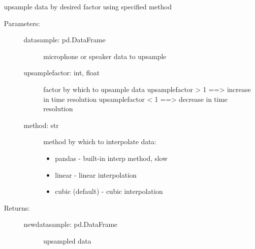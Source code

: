 \documentclass[letterpaper,10pt,english]{sphinxmanual}
\begin{document}
\begin{fulllineitems}
\label{\detokenize{code:ATom.atom_functions.upsample}}
upsample data by desired factor using specified method
\begin{description}
\item[{Parameters:}] \leavevmode\begin{description}
\item[{datasample: pd.DataFrame}] \leavevmode
microphone or speaker data to upsample

\item[{upsamplefactor: int, float}] \leavevmode
factor by which to upsample data
upsamplefactor \textgreater{} 1 ==\textgreater{} increase in time resolution
upsamplefactor \textless{} 1 ==\textgreater{} decrease in time resolution

\item[{method: str}] \leavevmode
method by which to interpolate data:
\begin{itemize}
\item {} 
pandas - built-in interp method, slow

\item {} 
linear - linear interpolation

\item {} 
cubic (default) - cubic interpolation

\end{itemize}

\end{description}

\item[{Returns:}] \leavevmode\begin{description}
\item[{newdatasample: pd.DataFrame}] \leavevmode
upsampled data

\end{description}

\end{description}

\end{fulllineitems}

\end{document}
